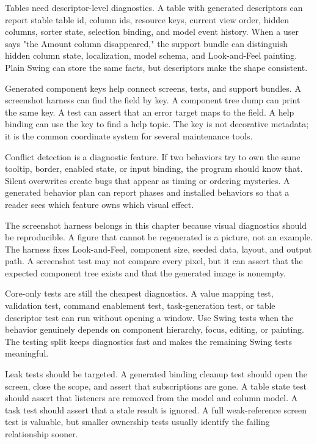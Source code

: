 Tables need descriptor-level diagnostics. A table with generated descriptors can report stable table id, column ids, resource keys, current view order, hidden columns, sorter state, selection binding, and model event history. When a user says "the Amount column disappeared," the support bundle can distinguish hidden column state, localization, model schema, and Look-and-Feel painting. Plain Swing can store the same facts, but descriptors make the shape consistent.

Generated component keys help connect screens, tests, and support bundles. A screenshot harness can find the field by key. A component tree dump can print the same key. A test can assert that an error target maps to the field. A help binding can use the key to find a help topic. The key is not decorative metadata; it is the common coordinate system for several maintenance tools.

Conflict detection is a diagnostic feature. If two behaviors try to own the same tooltip, border, enabled state, or input binding, the program should know that. Silent overwrites create bugs that appear as timing or ordering mysteries. A generated behavior plan can report phases and installed behaviors so that a reader sees which feature owns which visual effect.

The screenshot harness belongs in this chapter because visual diagnostics should be reproducible. A figure that cannot be regenerated is a picture, not an example. The harness fixes Look-and-Feel, component size, seeded data, layout, and output path. A screenshot test may not compare every pixel, but it can assert that the expected component tree exists and that the generated image is nonempty.

Core-only tests are still the cheapest diagnostics. A value mapping test, validation test, command enablement test, task-generation test, or table descriptor test can run without opening a window. Use Swing tests when the behavior genuinely depends on component hierarchy, focus, editing, or painting. The testing split keeps diagnostics fast and makes the remaining Swing tests meaningful.

Leak tests should be targeted. A generated binding cleanup test should open the screen, close the scope, and assert that subscriptions are gone. A table state test should assert that listeners are removed from the model and column model. A task test should assert that a stale result is ignored. A full weak-reference screen test is valuable, but smaller ownership tests usually identify the failing relationship sooner.

